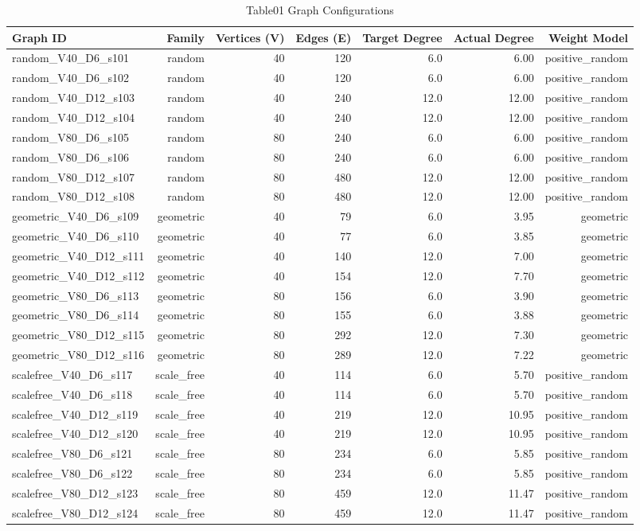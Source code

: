 \begin{table}[htbp]
\centering
\caption{Table01 Graph Configurations}
\begin{tabular}{lrrrrrr}
\hline
Graph ID & Family & Vertices (V) & Edges (E) & Target Degree & Actual Degree & Weight Model \\
\hline
random\_V40\_D6\_s101 & random & 40 & 120 & 6.0 & 6.00 & positive\_random \\
random\_V40\_D6\_s102 & random & 40 & 120 & 6.0 & 6.00 & positive\_random \\
random\_V40\_D12\_s103 & random & 40 & 240 & 12.0 & 12.00 & positive\_random \\
random\_V40\_D12\_s104 & random & 40 & 240 & 12.0 & 12.00 & positive\_random \\
random\_V80\_D6\_s105 & random & 80 & 240 & 6.0 & 6.00 & positive\_random \\
random\_V80\_D6\_s106 & random & 80 & 240 & 6.0 & 6.00 & positive\_random \\
random\_V80\_D12\_s107 & random & 80 & 480 & 12.0 & 12.00 & positive\_random \\
random\_V80\_D12\_s108 & random & 80 & 480 & 12.0 & 12.00 & positive\_random \\
geometric\_V40\_D6\_s109 & geometric & 40 & 79 & 6.0 & 3.95 & geometric \\
geometric\_V40\_D6\_s110 & geometric & 40 & 77 & 6.0 & 3.85 & geometric \\
geometric\_V40\_D12\_s111 & geometric & 40 & 140 & 12.0 & 7.00 & geometric \\
geometric\_V40\_D12\_s112 & geometric & 40 & 154 & 12.0 & 7.70 & geometric \\
geometric\_V80\_D6\_s113 & geometric & 80 & 156 & 6.0 & 3.90 & geometric \\
geometric\_V80\_D6\_s114 & geometric & 80 & 155 & 6.0 & 3.88 & geometric \\
geometric\_V80\_D12\_s115 & geometric & 80 & 292 & 12.0 & 7.30 & geometric \\
geometric\_V80\_D12\_s116 & geometric & 80 & 289 & 12.0 & 7.22 & geometric \\
scalefree\_V40\_D6\_s117 & scale\_free & 40 & 114 & 6.0 & 5.70 & positive\_random \\
scalefree\_V40\_D6\_s118 & scale\_free & 40 & 114 & 6.0 & 5.70 & positive\_random \\
scalefree\_V40\_D12\_s119 & scale\_free & 40 & 219 & 12.0 & 10.95 & positive\_random \\
scalefree\_V40\_D12\_s120 & scale\_free & 40 & 219 & 12.0 & 10.95 & positive\_random \\
scalefree\_V80\_D6\_s121 & scale\_free & 80 & 234 & 6.0 & 5.85 & positive\_random \\
scalefree\_V80\_D6\_s122 & scale\_free & 80 & 234 & 6.0 & 5.85 & positive\_random \\
scalefree\_V80\_D12\_s123 & scale\_free & 80 & 459 & 12.0 & 11.47 & positive\_random \\
scalefree\_V80\_D12\_s124 & scale\_free & 80 & 459 & 12.0 & 11.47 & positive\_random \\
\hline
\end{tabular}
\end{table}
